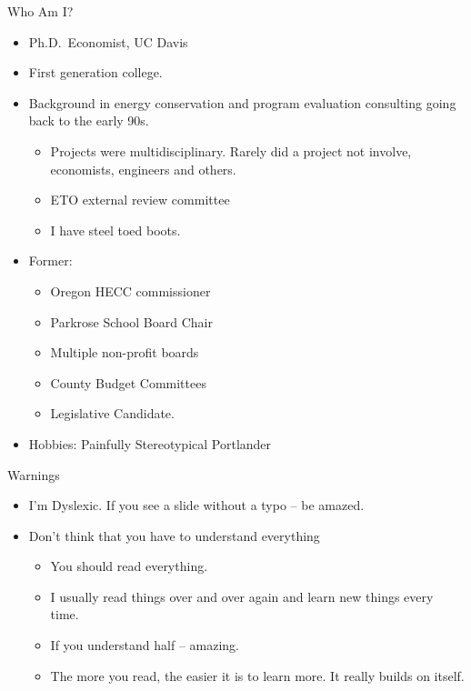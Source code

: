 \documentclass[
  ignorenonframetext,
]{beamer}
\providecommand{\tightlist}{%
  \setlength{\itemsep}{0pt}\setlength{\parskip}{0pt}}
\begin{document}
\begin{frame}{Who Am I?}
\protect\hypertarget{who-am-i}{}

\begin{itemize}
\tightlist
\item
  Ph.D.~Economist, UC Davis
\item
  First generation college.
\item
  Background in energy conservation and program evaluation consulting
  going back to the early 90s.

  \begin{itemize}
  \tightlist
  \item
    Projects were multidisciplinary. Rarely did a project not involve,
    economists, engineers and others.
  \item
    ETO external review committee
  \item
    I have steel toed boots.
  \end{itemize}
\item
  Former:

  \begin{itemize}
  \tightlist
  \item
    Oregon HECC commissioner
  \item
    Parkrose School Board Chair
  \item
    Multiple non-profit boards
  \item
    County Budget Committees
  \item
    Legislative Candidate.
  \end{itemize}
\item
  Hobbies: Painfully Stereotypical Portlander
\end{itemize}

\end{frame}

\begin{frame}{Warnings}
\protect\hypertarget{warnings}{}

\begin{itemize}
\tightlist
\item
  I'm Dyslexic. If you see a slide without a typo -- be amazed.
\item
  Don't think that you have to understand everything

  \begin{itemize}
  \tightlist
  \item
    You should read everything.
  \item
    I usually read things over and over again and learn new things every
    time.
  \item
    If you understand half -- amazing.
  \item
    The more you read, the easier it is to learn more. It really builds
    on itself.
  \end{itemize}
\end{itemize}

\end{frame}
\end{document}
